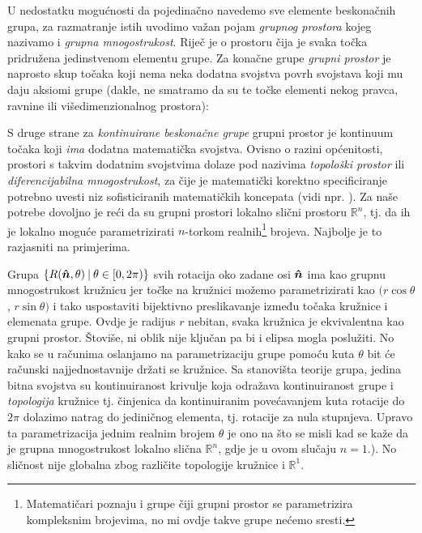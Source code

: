 U nedostatku mogućnosti da pojedinačno navedemo sve elemente beskonačnih
grupa, za razmatranje istih uvodimo važan pojam \emph{grupnog prostora}
kojeg nazivamo i \emph{grupna mnogostrukost}.
Riječ je o prostoru čija je svaka točka pridružena jedinstvenom
elementu grupe.
Za konačne grupe \emph{grupni prostor} je naprosto skup točaka koji
nema neka dodatna svojstva povrh svojstava koji mu daju aksiomi grupe
(dakle, ne smatramo da su te točke elementi nekog pravca, ravnine
ili višedimenzionalnog prostora):

\centerline{}

S druge strane za \emph{kontinuirane beskonačne grupe} grupni prostor je
kontinuum točaka koji \emph{ima} dodatna matematička svojstva. 
Ovisno o razini općenitosti, prostori s takvim dodatnim svojstvima dolaze pod
nazivima \emph{topološki prostor} ili \emph{diferencijabilna mnogostrukost},
za čije je matematički korektno specificiranje potrebno uvesti
niz sofisticiranih matematičkih koncepata (vidi npr. 
\cite{Smolic:2024}). Za naše potrebe dovoljno je reći da su grupni
prostori lokalno slični prostoru $\mathbb{R}^n$,
tj. da ih je lokalno moguće parametrizirati $n$-torkom realnih\footnote{Matematičari
    poznaju i grupe čiji grupni prostor se parametrizira kompleksnim
    brojevima, no mi ovdje takve grupe nećemo sresti.}
brojeva. Najbolje je to razjasniti na primjerima.


Grupa $\{R(\unitn, \theta) \td \theta\in[0,2\pi)\}$ svih rotacija oko zadane osi
$\unitn$ ima kao grupnu mnogostrukost kružnicu jer točke na kružnici možemo parametrizirati
kao $(r\cos\theta$, $r\sin\theta)$ i tako uspostaviti bijektivno preslikavanje
između točaka kružnice i elemenata grupe. 
Ovdje je radijus $r$ nebitan, svaka kružnica je ekvivalentna kao
grupni prostor. Štoviše, ni oblik nije ključan pa bi i elipsa mogla poslužiti.
No kako se u računima oslanjamo na parametrizaciju grupe pomoću
kuta $\theta$ bit će računski najjednostavnije držati se kružnice.
Sa stanovišta teorije grupa, jedina bitna svojstva su kontinuiranost krivulje
koja odražava kontinuiranost grupe i \emph{topologija} kružnice tj. činjenica da 
kontinuiranim povećavanjem kuta rotacije do $2\pi$ dolazimo natrag do jediničnog
elementa, tj. rotacije za nula stupnjeva.
Upravo ta parametrizacija jednim realnim brojem $\theta$ je ono na što
se misli kad se kaže da je grupna mnogostrukost lokalno slična $\mathbb{R}^n$,
gdje je u ovom slučaju $n=1$.).
No sličnost nije globalna zbog različite topologije kružnice
i $\mathbb{R}^1$.

